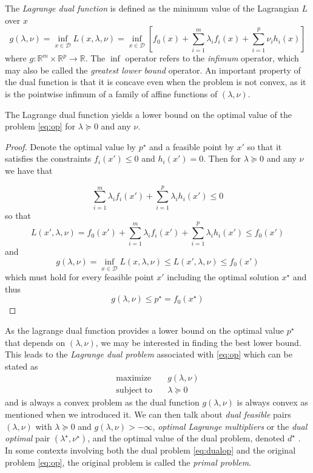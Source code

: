 The \emph{Lagrange dual function} is defined as the minimum value of the Lagrangian $L$ over $x$
\begin{equation}
g(\lambda, \nu) = \inf_{x \in \mathcal{D}} L(x, \lambda, \nu)
= \inf_{x \in \mathcal{D}} \left[ f_0(x) + \sum_{i=1}^m \lambda_i f_i(x)
+ \sum_{i=1}^p \nu_i h_i(x) \right]
\end{equation}
where $g: \mathbb{R}^m \times \mathbb{R}^p \rightarrow \mathbb{R}$. The $\inf$ operator refers to the \emph{infimum} operator, which may also be called the  \emph{greatest lower bound} operator. An important property of the dual function is that it is concave even when the problem is not convex, as it is the pointwise infimum of a family of affine functions of $(\lambda, \nu)$.

\begin{theorem}
  The Lagrange dual function yields a lower bound on the optimal value of the problem \eqref{eq:op} for $\lambda \succeq 0$ and any $\nu$.
\end{theorem}
\begin{proof}
  Denote the optimal value by $p^\star$ and a feasible point by $x'$ so that it satisfies the constraints $f_i(x') \le 0$ and $h_i(x') = 0$. Then for $\lambda \succeq 0$ and any $\nu$ we have that
  
  $$ \sum_{i=1}^m \lambda_i f_i(x') + \sum_{i=1}^p \lambda_i h_i(x') \le 0 $$
  so that
  $$ L(x',\lambda,\nu) = f_0(x') + \sum_{i=1}^m \lambda_i f_i(x') + \sum_{i=1}^p \lambda_i h_i(x') \le f_0(x') $$
  and
  $$ g(\lambda, \nu) = \inf_{x \in \mathcal{D}} L(x, \lambda, \nu) \le L(x', \lambda, \nu) \le f_0(x') $$
  which must hold for every feasible point $x'$ including the optimal solution $x^\star$ and thus
  $$ g(\lambda, \nu) \le p^\star = f_0(x^\star) $$ 
\end{proof}


As the lagrange dual function provides a lower bound on the optimal value $p^\star$ that depends on $(\lambda,\nu)$, we may be interested in finding the best lower bound. This leads to the \emph{Lagrange dual problem} associated with \eqref{eq:op} which can be stated as
\begin{align} \label{eq:dualop}
\mathrm{maximize}    \quad & g(\lambda, \nu) \nonumber \\
\mathrm{subject\;to} \quad & \lambda \succeq 0
\end{align}
and is always a convex problem as the dual function $g(\lambda, \nu)$ is always convex as mentioned when we introduced it. We can then talk about \emph{dual feasible} pairs $(\lambda,\nu)$ with $\lambda \succeq 0$ and $g(\lambda,\nu) > -\infty$, \emph{optimal Lagrange multipliers} or the \emph{dual optimal} pair $(\lambda^\star, \nu^\star)$, and the optimal value of the dual problem, denoted $d^\star$ . In some contexts involving both the dual problem \eqref{eq:dualop} and the original problem \eqref{eq:op}, the original problem is called the \emph{primal problem}.

